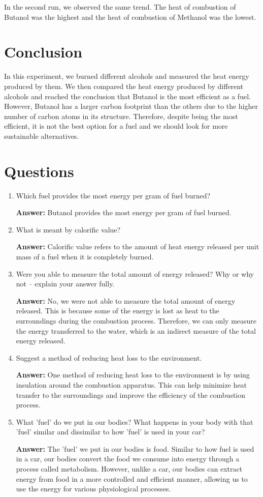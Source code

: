 \documentclass[a4paper, 12pt, english]{article}
\begin{document}
In the second run, we observed the same trend. The heat of combustion of
Butanol was the highest and the heat of combustion of Methanol was the lowest.

\section{Conclusion}
In this experiment, we burned different alcohols and measured the heat energy
produced by them. We then compared the heat energy produced by different
alcohols and reached the conclusion that Butanol is the most efficient as a
fuel. However, Butanol has a larger carbon footprint than the others due to the
higher number of carbon atoms in its structure. Therefore,
despite being the most efficient, it is not the best option for a fuel and we
should look for more sustainable alternatives.

\section{Questions}
\begin{enumerate}
	\item Which fuel provides the most energy per gram of fuel burned?

	      \textbf{Answer:} Butanol provides the most energy per gram of fuel burned.

	\item What is meant by calorific value?

	      \textbf{Answer:} Calorific value refers to the amount of heat energy released per unit mass of a fuel when it is completely burned.

	\item Were you able to measure the total amount of energy released? Why or why not --
	      explain your answer fully.

	      \textbf{Answer:} No, we were not able to measure the total amount of energy released. This is because some of the energy is lost as heat to the surroundings during the combustion process. Therefore, we can only measure the energy transferred to the water, which is an indirect measure of the total energy released.

	\item Suggest a method of reducing heat loss to the environment.

	      \textbf{Answer:} One method of reducing heat loss to the environment is by using insulation around the combustion apparatus. This can help minimize heat transfer to the surroundings and improve the efficiency of the combustion process.

	\item What 'fuel' do we put in our bodies? What happens in your body with that 'fuel'
	      similar and dissimilar to how 'fuel' is used in your car?

	      \textbf{Answer:} The 'fuel' we put in our bodies is food. Similar to how fuel is used in a car, our bodies convert the food we consume into energy through a process called metabolism. However, unlike a car, our bodies can extract energy from food in a more controlled and efficient manner, allowing us to use the energy for various physiological processes.
\end{enumerate}
\end{document}
